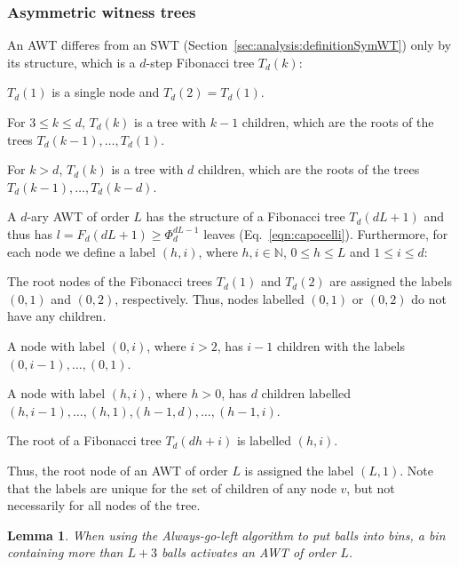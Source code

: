 \documentclass[a4paper,12pt]{article}
\newtheorem{lemma}{Lemma}
\begin{document}
\subsubsection{Asymmetric witness trees}
\label{sec:analysis:definitionAsymWT}
An AWT differes from an SWT (Section~\ref{sec:analysis:definitionSymWT}) only by its structure, which is a $d$-step Fibonacci tree $T_d\left(k \right)$:

\begin{compactitem}
\item $T_d(1)$ is a single node and  $T_d(2) = T_d(1)$.
\item For $3\leq k \leq d$, $T_d(k)$ is a tree with $k-1$ children, which are the roots of the trees $T_d(k-1),\ldots,T_d(1)$.
\item For $k>d$, $T_d(k)$ is a tree with $d$ children, which are the roots of the trees $T_d(k-1),\ldots,T_d(k-d)$.
\end{compactitem}
A $d$-ary AWT of order $L$ has the structure of a Fibonacci tree $T_d(d  L+1)$ and thus has $l=F_d(d L + 1) \geq \Phi_d^{d L-1}$ leaves (Eq.~\ref{eqn:capocelli}).
Furthermore, for each node we define a label $(h, i)$, where $h, i \in \mathbb{N}$, $0 \leq h \leq L$ and  $1\leq i \leq d$:
\begin{compactitem}
\item The root nodes of the Fibonacci trees $T_d(1)$ and $T_d(2)$ are assigned the labels $(0,1)$ and $(0,2)$, respectively. Thus, nodes labelled $(0,1)$ or $(0,2)$ do not have any children.
\item A node with label $(0, i)$, where $i>2$, has $i-1$ children with the labels $(0,i-1),\dots,(0,1)$.
\item A node with label $(h,i)$, where $h>0$, has $d$ children labelled $(h,i-1),\dots,(h,1)$,$(h-1,d),\dots,(h-1, i)$.
\item The root of a Fibonacci tree $T_d(d h+i)$ is labelled $(h, i)$. 
\end{compactitem}
Thus, the root node of an AWT of order $L$ is assigned the label $(L, 1)$. Note that the labels are unique for the set of children of any node $v$, but not necessarily for all nodes of the tree. 
\begin{lemma}
When using the Always-go-left algorithm to put balls into bins, a bin containing more than $L+3$ balls activates an AWT of order $L$.
\end{lemma}
\end{document}

